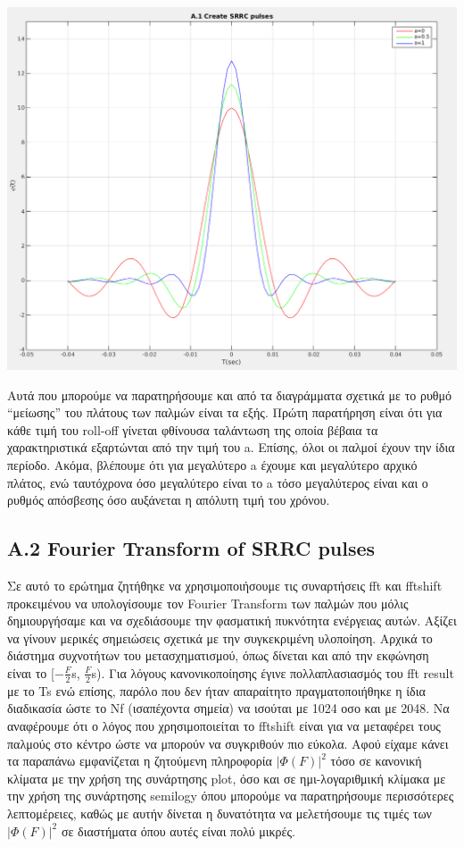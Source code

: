 \documentclass[11pt]{article}
\begin{document}
    \begin{center}{}
        \includegraphics[scale=0.27]{photos/A.1 CreateSRRCpulses_alt2.png}
    \end{center}
    
    Αυτά που μπορούμε να παρατηρήσουμε και από τα διαγράμματα σχετικά με το ρυθμό “μείωσης” του πλάτους των παλμών είναι τα εξής. Πρώτη παρατήρηση είναι ότι για κάθε τιμή του roll-off γίνεται φθίνουσα ταλάντωση της οποία βέβαια τα χαρακτηριστικά εξαρτώνται από την τιμή του a. Επίσης, όλοι οι παλμοί έχουν την ίδια περίοδο. Ακόμα, βλέπουμε ότι για μεγαλύτερο a έχουμε και μεγαλύτερο αρχικό πλάτος, ενώ ταυτόχρονα όσο μεγαλύτερο είναι το a τόσο μεγαλύτερος είναι και ο ρυθμός απόσβεσης όσο αυξάνεται η απόλυτη τιμή του χρόνου.
    
    
    \subsection*{Α.2 Fourier Transform of SRRC pulses}
    Σε αυτό το ερώτημα ζητήθηκε να χρησιμοποιήσουμε τις συναρτήσεις fft και fftshift προκειμένου να υπολογίσουμε τον Fourier Transform των παλμών που μόλις δημιουργήσαμε και να σχεδιάσουμε την φασματική πυκνότητα ενέργειας αυτών. Αξίζει να γίνουν μερικές σημειώσεις σχετικά με την συγκεκριμένη υλοποίηση. Αρχικά το διάστημα συχνοτήτων του μετασχηματισμού, όπως δίνεται και από την εκφώνηση είναι το [−$\frac{F}{2}$s, $\frac{F}{2}$s). Για λόγους κανονικοποίησης έγινε πολλαπλασιασμός του fft result με το Ts ενώ επίσης, παρόλο που δεν ήταν απαραίτητο πραγματοποιήθηκε η ίδια διαδικασία ώστε το Νf (ισαπέχοντα σημεία) να ισούται με 1024 οσο και με 2048. Να αναφέρουμε ότι ο λόγος που χρησιμοποιείται το fftshift είναι για να μεταφέρει τους παλμούς στο κέντρο ώστε να μπορούν να συγκριθούν πιο εύκολα. Αφού είχαμε κάνει τα παραπάνω εμφανίζεται η ζητούμενη πληροφορία $|Φ(F)|^2$ τόσο σε κανονική κλίματα με την χρήση της συνάρτησης plot, όσο και σε ημι-λογαριθμική κλίμακα με την χρήση της συνάρτησης semilogy όπου μπορούμε να παρατηρήσουμε περισσότερες λεπτομέρειες, καθώς με αυτήν δίνεται η δυνατότητα να μελετήσουμε τις τιμές των $|Φ(F)|^2$ σε διαστήματα όπου αυτές είναι πολύ μικρές.
    
\end{document}
